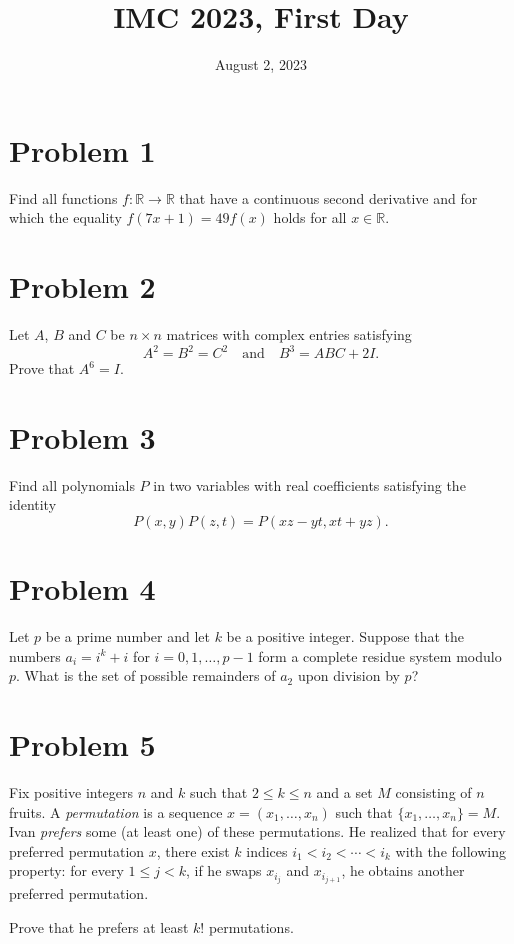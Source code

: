\documentclass{article}
\title{IMC 2023, First Day}
\date{August 2, 2023}
\begin{document}
\maketitle

\section*{Problem 1}
Find all functions $f : \mathbb{R} \to \mathbb{R}$ that have a continuous second derivative and for which the equality $f(7x+1) = 49 f(x)$ holds for all $x \in \mathbb{R}$.

\section*{Problem 2}
Let $A$, $B$ and $C$ be $n \times n$ matrices with complex entries satisfying
\[ A^2 = B^2 = C^2 \quad \text{and} \quad B^3 = ABC + 2I. \]
Prove that $A^6 = I$.

\section*{Problem 3}
Find all polynomials $P$ in two variables with real coefficients satisfying the identity
\[ P(x,y) P(z,t) = P(xz - yt, xt + yz). \]

\section*{Problem 4}
Let $p$ be a prime number and let $k$ be a positive integer. Suppose that the numbers $a_i = i^k + i$ for $i = 0, 1, \ldots, p-1$ form a complete residue system modulo $p$. What is the set of possible remainders of $a_2$ upon division by $p$?

\section*{Problem 5}
Fix positive integers $n$ and $k$ such that $2 \leq k \leq n$ and a set $M$ consisting of $n$ fruits. A \emph{permutation} is a sequence $x = (x_1, \ldots, x_n)$ such that $\{x_1, \ldots, x_n\} = M$. Ivan \emph{prefers} some (at least one) of these permutations. He realized that for every preferred permutation $x$, there exist $k$ indices $i_1 < i_2 < \cdots < i_k$ with the following property: for every $1 \leq j < k$, if he swaps $x_{i_j}$ and $x_{i_{j+1}}$, he obtains another preferred permutation.

Prove that he prefers at least $k!$ permutations.
\end{document}
